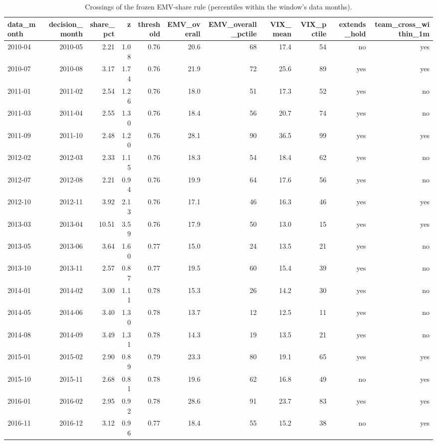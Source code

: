 \begin{table}[htbp]\centering\small
\caption{Crossings of the frozen EMV-share rule (percentiles within the window's data months).}
\label{tab:m8_crossings}
\begin{tabular}{lrrrrrrrrrr}
\toprule
data\_month & decision\_month & share\_pct & z & threshold & EMV\_overall & EMV\_overall\_pctile & VIX\_mean & VIX\_pctile & extends\_hold & team\_cross\_within\_1m \\
\midrule
2010-04 & 2010-05 & 2.21 & 1.08 & 0.76 & 20.6 & 68 & 17.4 & 54 & no & yes \\
2010-07 & 2010-08 & 3.17 & 1.74 & 0.76 & 21.9 & 72 & 25.6 & 89 & yes & yes \\
2011-01 & 2011-02 & 2.54 & 1.26 & 0.76 & 18.0 & 51 & 17.3 & 52 & yes & no \\
2011-03 & 2011-04 & 2.55 & 1.30 & 0.76 & 18.4 & 56 & 20.7 & 74 & yes & no \\
2011-09 & 2011-10 & 2.48 & 1.20 & 0.76 & 28.1 & 90 & 36.5 & 99 & yes & yes \\
2012-02 & 2012-03 & 2.33 & 1.15 & 0.76 & 18.3 & 54 & 18.4 & 62 & yes & no \\
2012-07 & 2012-08 & 2.21 & 0.94 & 0.76 & 19.9 & 64 & 17.6 & 56 & yes & no \\
2012-10 & 2012-11 & 3.92 & 2.13 & 0.76 & 17.1 & 46 & 16.3 & 46 & yes & yes \\
2013-03 & 2013-04 & 10.51 & 3.59 & 0.76 & 17.9 & 50 & 13.0 & 15 & yes & yes \\
2013-05 & 2013-06 & 3.64 & 1.60 & 0.77 & 15.0 & 24 & 13.5 & 21 & yes & no \\
2013-10 & 2013-11 & 2.57 & 0.87 & 0.77 & 19.5 & 60 & 15.4 & 39 & yes & no \\
2014-01 & 2014-02 & 3.00 & 1.11 & 0.78 & 15.3 & 26 & 14.2 & 30 & yes & no \\
2014-05 & 2014-06 & 3.40 & 1.30 & 0.78 & 13.7 & 12 & 12.5 & 11 & yes & no \\
2014-08 & 2014-09 & 3.49 & 1.31 & 0.78 & 14.3 & 19 & 13.5 & 21 & yes & no \\
2015-01 & 2015-02 & 2.90 & 0.89 & 0.79 & 23.3 & 80 & 19.1 & 65 & yes & yes \\
2015-10 & 2015-11 & 2.68 & 0.81 & 0.78 & 19.6 & 62 & 16.8 & 49 & no & yes \\
2016-01 & 2016-02 & 2.95 & 0.92 & 0.78 & 28.6 & 91 & 23.7 & 83 & yes & yes \\
2016-11 & 2016-12 & 3.12 & 0.96 & 0.77 & 18.4 & 55 & 15.2 & 38 & no & yes \\

\end{tabular}
\end{table}
